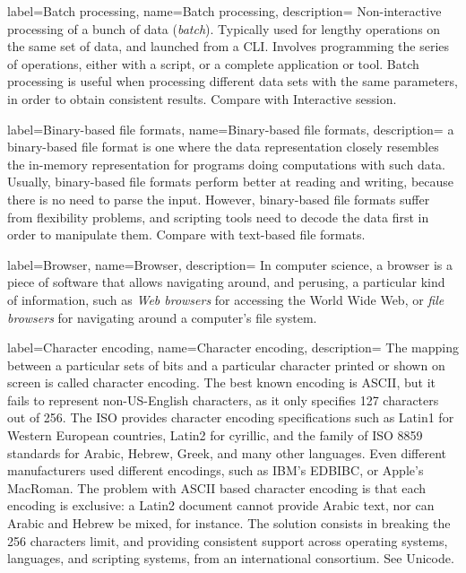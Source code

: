 {
    label={Batch processing},
    name={Batch processing},
    description={
    	Non-interactive processing of a bunch of data (\emph{batch}).
        Typically used for lengthy operations on the same set of data,
        and launched from a \gls{CLI}. Involves programming the series of
        operations, either with a script, or a complete application or
        tool. Batch processing is useful when processing different data
        sets with the same parameters, in order to obtain consistent
        results. Compare with \gls{Interactive session}.
    }
}

{
    label={Binary-based file formats},
    name={Binary-based file formats},
    description={
    	a binary-based file format is one where the data representation
        closely resembles the in-memory representation for programs
        doing computations with such data. Usually, binary-based file
        formats perform better at reading and writing, because there is
        no need to parse the input. However, binary-based file formats
        suffer from flexibility problems, and scripting tools need to
        decode the data first in order to manipulate them. Compare with
        \gls{text-based file formats}.
    }
}

{
    label={Browser},
    name={Browser},
    description={
    	In computer science, a browser is a piece of software that
        allows navigating around, and perusing, a particular kind of
        information, such as \emph{Web browsers} for accessing the
        \gls{World Wide Web}, or \emph{file browsers} for navigating
        around a computer's file system.
    }
}

{
    label={Character encoding},
    name={Character encoding},
    description={
    	The mapping between a particular sets of bits and a particular
        character printed or shown on screen is called character
        encoding. The best known encoding is \gls{ASCII}, but it fails
        to represent non-US-English characters, as it only specifies
        127 characters out of 256. The ISO provides character encoding
        specifications such as Latin1 for Western European countries,
        Latin2 for cyrillic, and the family of ISO 8859 standards for
        Arabic, Hebrew, Greek, and many other languages. Even different
        manufacturers used different encodings, such as IBM's EDBIBC,
        or Apple's MacRoman. The problem with ASCII based character
        encoding is that each encoding is exclusive: a Latin2 document
        cannot provide Arabic text, nor can Arabic and Hebrew be mixed,
        for instance. The solution consists in breaking the 256
        characters limit, and providing consistent support across
        operating systems, languages, and scripting systems, from an
        international consortium. See \gls{Unicode}.
    }
}

